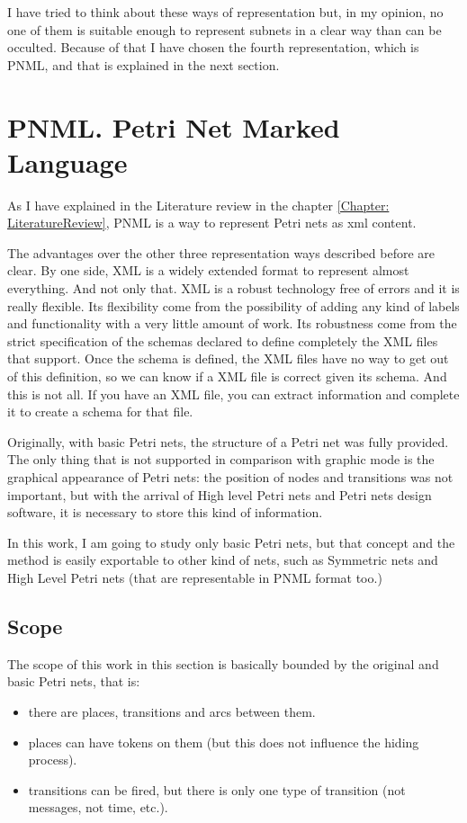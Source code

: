 I have tried to think about these ways of representation but, in my opinion, no one of them is suitable enough to represent subnets in a clear way than can be occulted. Because of that I have chosen the fourth representation, which is PNML, and that is explained in the next section. 

\section{PNML. Petri Net Marked Language}

As I have explained in the Literature review in the chapter \ref{Chapter: LiteratureReview},
 PNML is a way to represent Petri nets as xml content.

The advantages over the other three representation ways described before
are clear. By one side, XML is a widely extended format to represent almost
everything. And not only that. XML is a robust technology free of errors
and it is really flexible. Its flexibility come from the possibility of adding any kind
of labels and functionality with a very little amount of work. Its robustness come from the strict
specification of the schemas declared to define completely the XML files    
that support. Once
the schema is defined, the XML files have no way to get out of this definition,
so we can know if a XML file is correct given its schema. And this is not all. If you have an XML file, you can extract information and complete it to create a schema for that file.  



Originally, with basic Petri nets, the structure of a Petri net was fully provided.
The only thing that is not supported in comparison with graphic mode is the graphical appearance of Petri nets: the position of nodes and
transitions was not
important, but with the arrival of High level Petri nets and Petri nets design
software, it is necessary to store this kind of information.

In this work, I am going to study only basic Petri nets, but
that concept and the method is easily exportable to other kind of nets, such as Symmetric nets and High Level Petri nets (that are representable in PNML
format too.)

\subsection{Scope}
The scope of this work in this section is basically bounded by the original
and basic Petri nets, that is:
\begin{itemize}
\item there are places, transitions and arcs between them.
\item places can have tokens on them (but this does not  influence the hiding process).
\item transitions can be fired, but there is only one type of transition
(not messages, not time, etc.).
\end{itemize}

